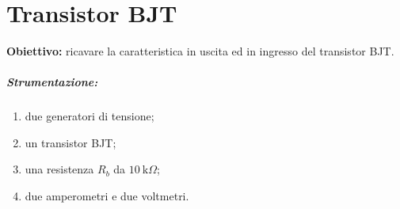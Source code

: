 \chapter{Transistor BJT}

\renewcommand\thesection{\Roman{section}}

\textbf{Obiettivo:} ricavare la caratteristica in uscita ed in ingresso del transistor BJT.

\paragraph{Strumentazione:} 
\begin{enumerate}
    \item due generatori di tensione;
    \item un transistor BJT;
    \item una resistenza $R_b$ da $\SI{10}{\kilo\Omega}$;
    \item due amperometri e due voltmetri.
\end{enumerate}

